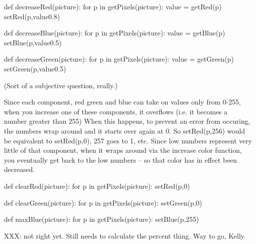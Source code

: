 \begin{exercises}
\begin{ex}
\begin{example}
def decreaseRed(picture):
		for p in getPixels(picture):
		value = getRed(p)
		setRed(p,value0.8)
\end{example}

\end{ex}



\begin{ex}

\begin{example}

def decreaseBlue(picture):
		for p in getPixels(picture):
		value = getBlue(p)
		setBlue(p,value0.5)

def decreaseGreen(picture):
		for p in getPixels(picture):
		value = getGreen(p)
		setGreen(p,value0.5)

\end{example}
\end{ex}

\begin{ex}
(Sort of a subjective question, really.)
\end{ex}

\begin{ex}
Since each component, red green and blue can take on values only from
0-255, when you increase one of these components, it overflows (i.e.
it becomes a number greater than 255) When this happens, to prevent an
error from occuring, the numbers wrap around and it starts over again
at 0. So setRed(p,256) would be equivalent to setRed(p,0), 257 goes to 1,
etc. Since low numbers represent very little of that component,
when it wraps around via the increase color function, you eventually get
back to the low numbers -- so that color has in effect been decreased.
\end{ex}

\begin{ex}
\begin{example}
def clearRed(picture):
    for p in getPixels(picture):
    setRed(p,0)

def clearGreen(picture):
    for p in getPixels(picture):
    setGreen(p,0)
\end{example}
\end{ex}

\begin{ex}
\begin{example}
def maxBlue(picture):
    for p in getPixels(picture):
    setBlue(p,255)
\end{example}
\end{ex}

\begin{ex}
\begin{example}
XXX: not right yet. Still needs to calculate the percent thing. Way to go,
Kelly.


\end{example}
\end{ex}
\end{exercises}
